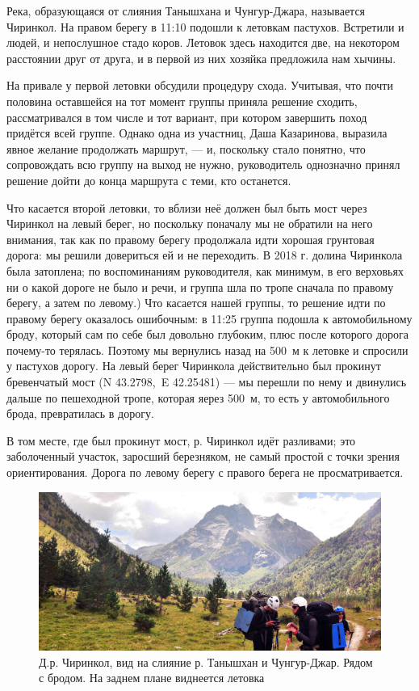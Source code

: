 Река, образующаяся от слияния Танышхана и Чунгур-Джара, называется Чиринкол. На правом берегу в 11:10 подошли к летовкам пастухов. Встретили и людей, и непослушное стадо коров. Летовок здесь находится две, на некотором расстоянии друг от друга, и в первой из них хозяйка предложила нам хычины. 

На привале у первой летовки обсудили процедуру схода. Учитывая, что почти половина оставшейся на тот момент группы приняла решение сходить, рассматривался в том числе и тот вариант, при котором завершить поход придётся всей группе. Однако одна из участниц, Даша Казаринова, выразила явное желание продолжать маршрут, --- и, поскольку стало понятно, что сопровождать всю группу на выход не нужно, руководитель однозначно принял решение дойти до конца маршрута с теми, кто останется.

Что касается второй летовки, то вблизи неё должен был быть мост через Чиринкол на левый берег, но поскольку поначалу мы не обратили на него внимания, так как по правому берегу продолжала идти хорошая грунтовая дорога: мы решили довериться ей и не переходить. В 2018 г. \cite{Korolyov2018} долина Чиринкола была затоплена; по воспоминаниям руководителя, как минимум, в его верховьях ни о какой дороге не было и речи, и группа шла по тропе сначала по правому берегу, а затем по левому.) Что касается нашей группы, то решение идти по правому берегу оказалось ошибочным: в 11:25 группа подошла к автомобильному броду, который сам по себе был довольно глубоким, плюс после которого дорога почему-то терялась. Поэтому мы вернулись назад на 500~м к летовке и спросили у пастухов дорогу. На левый берег Чиринкола действительно был прокинут бревенчатый мост (N 43.2798\degree,~E 42.25481\degree) --- мы перешли по нему и двинулись дальше по пешеходной тропе, которая яерез 500~м, то есть у автомобильного брода, превратилась в дорогу. 

В том месте, где был прокинут мост, р. Чиринкол идёт разливами; это заболоченный участок, заросший березняком, не самый простой с точки зрения ориентирования. Дорога по левому берегу с правого берега не просматривается.

\begin{figure}[h!]
	\centering
	\includegraphics[width=0.7\linewidth]{../pics/DSC_0462 2}
	\caption{Д.р. Чиринкол, вид на слияние р. Танышхан и Чунгур-Джар. Рядом с бродом. На заднем плане виднеется летовка}
	\label{fig:DSC_0462}
\end{figure}

